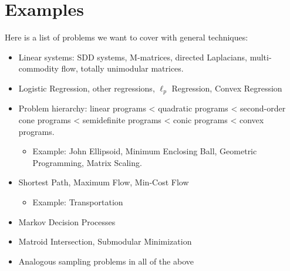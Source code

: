 
\section*{Examples}

Here is a list of problems we want to cover with general techniques: 
\begin{itemize}
\item Linear systems: SDD systems, M-matrices, directed Laplacians, multi-commodity
flow, totally unimodular matrices.
\item Logistic Regression, other regressions, $\ell_{p}$ Regression, Convex
Regression
\item Problem hierarchy: linear programs < quadratic programs < second-order
cone programs < semidefinite programs < conic programs < convex programs.
\begin{itemize}
\item Example: John Ellipsoid, Minimum Enclosing Ball, Geometric Programming,
Matrix Scaling.
\end{itemize}
\item Shortest Path, Maximum Flow, Min-Cost Flow
\begin{itemize}
\item Example: Transportation
\end{itemize}
\item Markov Decision Processes
\item Matroid Intersection, Submodular Minimization
\item Analogous sampling problems in all of the above
\end{itemize}

